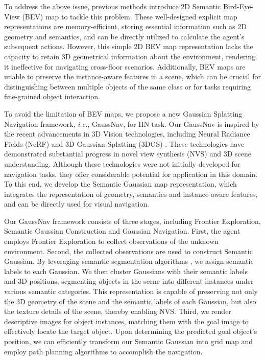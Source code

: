 To address the above issue, previous methods \cite{chaplot2020learning, chaplot2020object, krantz2023navigating, ramakrishnan2022poni, al2022zero, ma2022end, lei2024instanceaware} introduce 2D Semantic Bird-Eye-View (BEV) map to tackle this problem. These well-designed explicit map representations are memory-efficient, storing essential information such as 2D geometry and semantics, and can be directly utilized to calculate the agent's subsequent actions. However, this simple 2D BEV map representation lacks the capacity to retain 3D geometrical information about the environment, rendering it ineffective for navigating cross-floor scenarios. Additionally, BEV maps are unable to preserve the instance-aware features in a scene, which can be crucial for distinguishing between multiple objects of the same class or for tasks requiring fine-grained object interaction. 


To avoid the limitation of BEV maps, we propose a new Gaussian Splatting Navigation framework, \textit{i.e.}, GaussNav, for IIN task. Our GaussNav is inspired by the recent advancements in 3D Vision technologies, including Neural Radiance Fields (NeRF) \cite{mildenhall2020nerf} and 3D Gaussian Splatting (3DGS) \cite{kerbl3Dgaussians}. These technologies have demonstrated substantial progress in novel view synthesis (NVS) and 3D scene understanding. Although these technologies were not initially developed for navigation tasks, they offer considerable potential for application in this domain. To this end, we develop the Semantic Gaussian map representation, which integrates the representation of geometry, semantics and instance-aware features, and can be directly used for visual navigation. 

Our GaussNav framework consists of three stages, including Frontier Exploration, Semantic Gaussian Construction and Gaussian Navigation. 
First, the agent employs Frontier Exploration to collect observations of the unknown environment.
Second, the collected observations are used to construct Semantic Gaussian. By leveraging semantic segmentation algorithms \cite{he2017mask, wang2023internimage}, we assign semantic labels to each Gaussian. We then cluster Gaussians with their semantic labels and 3D positions, segmenting objects in the scene into different instances under various semantic categories. This representation is capable of preserving not only the 3D geometry of the scene and the semantic labels of each Gaussian, but also the texture details of the scene, thereby enabling NVS. 
Third, we render descriptive images for object instances, matching them with the goal image to effectively locate the target object. Upon determining the predicted goal object's position, we can efficiently transform our Semantic Gaussian into grid map and employ path planning algorithms to accomplish the navigation. 

